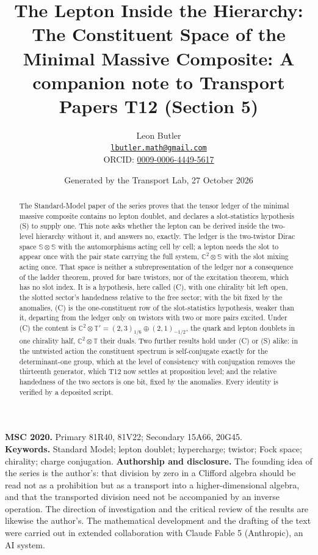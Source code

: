\documentclass[11pt]{article}
\title{\bfseries The Lepton Inside the Hierarchy: The Constituent Space of the Minimal Massive Composite: A companion note to Transport Papers T12 (Section 5)}
\author{Leon Butler\\ \normalsize\href{mailto:lbutler.math@gmail.com}{\texttt{lbutler.math@gmail.com}}\\ \normalsize ORCID: \href{https://orcid.org/0009-0006-4449-5617}{0009-0006-4449-5617}}
\date{Generated by the Transport Lab, 27 October 2026}
\theoremstyle{definition}
\theoremstyle{plain}
\providecommand{\C}{}\renewcommand{\C}{\mathbb{C}}
\providecommand{\Sp}{}\renewcommand{\Sp}{\mathbb{S}}
\providecommand{\T}{}\renewcommand{\T}{\mathbb{T}}
\begin{document}
\maketitle
\begin{abstract}
\normalsize
The Standard-Model paper of the series proves that the tensor ledger of the minimal massive composite contains no lepton doublet, and declares a slot-statistics hypothesis (S) to supply one. This note asks whether the lepton can be derived inside the two-level hierarchy without it, and answers no, exactly. The ledger is the two-twistor Dirac space $\Sp \otimes \Sp$ with the automorphisms acting cell by cell; a lepton needs the slot to appear once with the pair state carrying the full system, $\C^{2} \otimes \Sp$ with the slot mixing acting once. That space is neither a subrepresentation of the ledger nor a consequence of the ladder theorem, proved for bare twistors, nor of the excitation theorem, which has no slot index. It is a hypothesis, here called (C), with one chirality bit left open, the slotted sector's handedness relative to the free sector; with the bit fixed by the anomalies, (C) is the one-constituent row of the slot-statistics hypothesis, weaker than it, departing from the ledger only on twistors with two or more pairs excited. Under (C) the content is $\C^{2} \otimes \T' = (2,3)_{1/6} \oplus (2,1)_{-1/2}$, the quark and lepton doublets in one chirality half, $\C^{2} \otimes \T$ their duals. Two further results hold under (C) or (S) alike: in the untwisted action the constituent spectrum is self-conjugate exactly for the determinant-one group, which at the level of consistency with conjugation removes the thirteenth generator, which T12 now settles at proposition level; and the relative handedness of the two sectors is one bit, fixed by the anomalies. Every identity is verified by a deposited script.
\end{abstract}
\medskip
\noindent\textbf{MSC 2020.} Primary 81R40, 81V22; Secondary 15A66, 20G45.\\
\textbf{Keywords.} Standard Model; lepton doublet; hypercharge; twistor; Fock space; chirality; charge conjugation.
\newpage
\noindent \textbf{Authorship and disclosure. }The founding idea of the series is the author's: that division by zero in a Clifford algebra should be read not as a prohibition but as a transport into a higher-dimensional algebra, and that the transported division need not be accompanied by an inverse operation. The direction of investigation and the critical review of the results are likewise the author's. The mathematical development and the drafting of the text were carried out in extended collaboration with Claude Fable 5 (Anthropic), an AI system.
\end{document}
